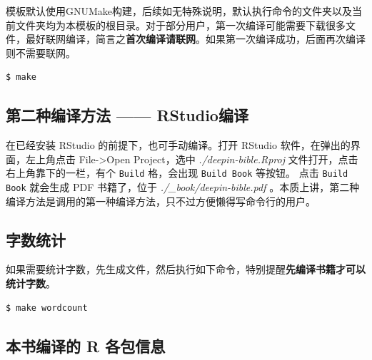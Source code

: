 \documentclass[doctor,openright,twoside]{sjtuthesis}
\newcommand{\passthrough}[1]{#1}
\theoremstyle{plain}
\theoremstyle{definition}
\theoremstyle{remark}
\theoremstyle{ocrenumbox}
\theoremstyle{plain}
\begin{document}
模板默认使用GNUMake构建，后续如无特殊说明，默认执行命令的文件夹以及当前文件夹均为本模板的根目录。对于部分用户，第一次编译可能需要下载很多文件，最好联网编译，简言之\textbf{首次编译请联网}。如果第一次编译成功，后面再次编译则不需要联网。

\begin{lstlisting}[language=bash, numbers=none]
$ make
\end{lstlisting}

\hypertarget{-rstudio}{%
\subsection{第二种编译方法 ------ RStudio编译}\label{-rstudio}}

在已经安装 RStudio 的前提下，也可手动编译。打开 RStudio
软件，在弹出的界面，左上角点击 File-\textgreater{}Open Project，选中
\emph{./deepin-bible.Rproj} 文件打开，点击右上角靠下的一栏，有个
\passthrough{\lstinline!Build!} 格，会出现
\passthrough{\lstinline!Build Book!} 等按钮。 点击
\passthrough{\lstinline!Build Book!} 就会生成 PDF 书籍了，位于
\emph{./\_book/deepin-bible.pdf}
。本质上讲，第二种编译方法是调用的第一种编译方法，只不过方便懒得写命令行的用户。

\subsection{字数统计}

如果需要统计字数，先生成文件，然后执行如下命令，特别提醒\textbf{先编译书籍才可以统计字数}。

\begin{lstlisting}[language=bash, numbers=none]
$ make wordcount
\end{lstlisting}

\hypertarget{-r-}{%
\subsection{本书编译的 R 各包信息}\label{-r-}}
\end{document}
